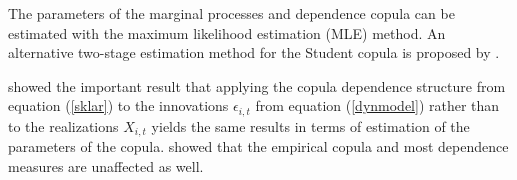 The parameters of the marginal processes and dependence copula can
be estimated with the maximum likelihood estimation (MLE) method. An
alternative two-stage estimation method for the Student copula
is proposed by \cite{mcneil05b}.

\cite{chenfan06} showed the important result that applying the copula dependence structure
from equation (\ref{sklar}) to the innovations $\epsilon_{i,t}$ from equation (\ref{dynmodel}) rather
than to the realizations $X_{i,t}$ yields the same results
in terms of estimation of the parameters of the copula. \cite{Remillard11} showed that
the empirical copula and most dependence measures are unaffected as well.

